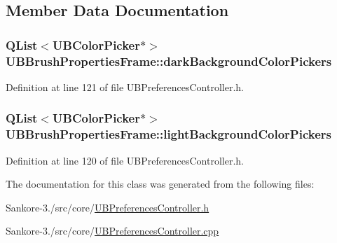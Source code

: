 \subsection{Member Data Documentation}
\hypertarget{class_u_b_brush_properties_frame_a3888a5a07d5846260de1fcb9d4e84efd}{
\subsubsection[{dark\-Background\-Color\-Pickers}]{\setlength{\rightskip}{0pt plus 5cm}Q\-List$<${\bf U\-B\-Color\-Picker}$\ast$$>$ U\-B\-Brush\-Properties\-Frame\-::dark\-Background\-Color\-Pickers}}\label{d4/da2/class_u_b_brush_properties_frame_a3888a5a07d5846260de1fcb9d4e84efd}


Definition at line 121 of file U\-B\-Preferences\-Controller.\-h.

\hypertarget{class_u_b_brush_properties_frame_ac6045e25808f635fcf4ef5615a3c6afa}{
\subsubsection[{light\-Background\-Color\-Pickers}]{\setlength{\rightskip}{0pt plus 5cm}Q\-List$<${\bf U\-B\-Color\-Picker}$\ast$$>$ U\-B\-Brush\-Properties\-Frame\-::light\-Background\-Color\-Pickers}}\label{d4/da2/class_u_b_brush_properties_frame_ac6045e25808f635fcf4ef5615a3c6afa}


Definition at line 120 of file U\-B\-Preferences\-Controller.\-h.



The documentation for this class was generated from the following files\-:\begin{DoxyCompactItemize}
\item 
Sankore-\/3./src/core/\hyperlink{_u_b_preferences_controller_8h}{U\-B\-Preferences\-Controller.\-h}\item 
Sankore-\/3./src/core/\hyperlink{_u_b_preferences_controller_8cpp}{U\-B\-Preferences\-Controller.\-cpp}\end{DoxyCompactItemize}
